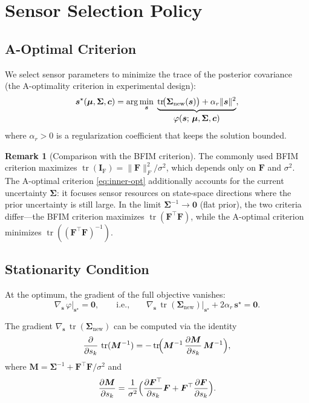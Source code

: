 \documentclass[11pt]{article}
\newcommand{\tr}{\operatorname{tr}}
\newcommand{\bs}{\bm{s}}
\newcommand{\bc}{\bm{c}}
\newcommand{\bmu}{\bm{\mu}}
\newcommand{\sstar}{\bs^{\star}}
\newcommand{\Snew}{\bm{\Sigma}_{\mathrm{new}}}
\newcommand{\FIM}{\bm{I}_{\mathrm{F}}}
\theoremstyle{definition}
\newtheorem{remark}{Remark}
\begin{document}
\section{Sensor Selection Policy}
\label{sec:sensor-selection}

\subsection{A-Optimal Criterion}

We select sensor parameters to minimize the trace of the posterior
covariance (the A-optimality criterion in experimental design):
\begin{equation}
  \sstar(\bmu, \bm{\Sigma}, \bc)
  = \arg\min_{\bs}\;\underbrace{%
    \tr\!\bigl(\Snew(\bs)\bigr) + \alpha_r \|\bs\|^2
  }_{\displaystyle \varphi(\bs;\, \bmu, \bm{\Sigma}, \bc)},
  \label{eq:inner-opt}
\end{equation}
where $\alpha_r > 0$ is a regularization coefficient that keeps the
solution bounded.

\begin{remark}[Comparison with the BFIM criterion]
The commonly used BFIM criterion maximizes $\tr(\FIM) = \|\bm{F}\|_F^2 / \sigma^2$,
which depends only on $\bm{F}$ and $\sigma^2$.  The A-optimal criterion
\eqref{eq:inner-opt} additionally accounts for the current uncertainty
$\bm{\Sigma}$: it focuses sensor resources on state-space directions where
the prior uncertainty is still large.  In the limit $\bm{\Sigma}^{-1} \to
\bm{0}$ (flat prior), the two criteria differ---the BFIM criterion
maximizes $\tr(\bm{F}^\top\bm{F})$, while the A-optimal criterion
minimizes $\tr((\bm{F}^\top\bm{F})^{-1})$.
\end{remark}

\subsection{Stationarity Condition}

At the optimum, the gradient of the full objective vanishes:
\begin{equation}
  \nabla_{\bs}\,\varphi\big|_{\sstar} = \bm{0},
  \qquad\text{i.e.,}\qquad
  \nabla_{\bs}\,\tr(\Snew)\big|_{\sstar} + 2\alpha_r\,\sstar = \bm{0}.
  \label{eq:stationarity}
\end{equation}

The gradient $\nabla_{\bs}\,\tr(\Snew)$ can be computed via the identity
\begin{equation}
  \frac{\partial}{\partial s_k}\,\tr(\bm{M}^{-1})
  = -\tr\!\Bigl(\bm{M}^{-1}\,\frac{\partial \bm{M}}{\partial s_k}\,\bm{M}^{-1}\Bigr),
  \label{eq:tr-inv-deriv}
\end{equation}
where $\bm{M} = \bm{\Sigma}^{-1} + \bm{F}^\top\bm{F}/\sigma^2$ and
\begin{equation}
  \frac{\partial \bm{M}}{\partial s_k}
  = \frac{1}{\sigma^2}\Bigl(
    \frac{\partial \bm{F}^\top}{\partial s_k}\bm{F}
    + \bm{F}^\top \frac{\partial \bm{F}}{\partial s_k}
  \Bigr).
  \label{eq:dM-ds}
\end{equation}
\end{document}
